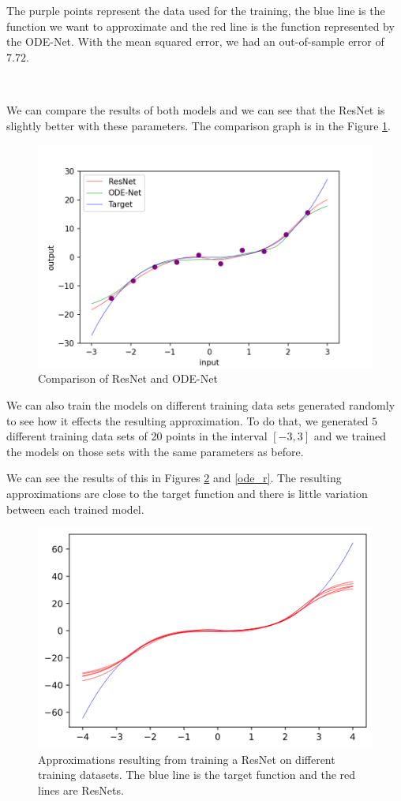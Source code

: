 \documentclass[10pt,a4paper]{article}
\theoremstyle{definition}
\theoremstyle{plain}
\begin{document}
The purple points represent the data used for the training, the blue line is the function we want to approximate and the red line is the function represented by the ODE-Net. With the mean squared error, we had an out-of-sample error of $7.72$.

~

We can compare the results of both models and we can see that the ResNet is slightly better with these parameters. The comparison graph is in the Figure \ref{comparaison}.
\begin{figure}[!h]
\center
\includegraphics[scale=0.75]{comparaison_final.png}
\caption{Comparison of ResNet and ODE-Net}
\label{comparaison}
\end{figure}


We can also train the models on different training data sets generated randomly to see how it effects the resulting approximation. To do that, we generated $5$ different training data sets of 20 points in the interval $[-3,3]$ and we trained the models on those sets with the same parameters as before.

We can see the results of this in Figures \ref{res_r} and \ref{ode_r}. The resulting approximations are close to the target function and there is little variation between each trained model.

\begin{figure}[!h]
\center
\includegraphics[scale=0.6]{resnet_random.png}
\caption{Approximations resulting from training a ResNet on different training datasets. The blue line is the target function and the red lines are ResNets.}
\label{res_r}
\end{figure}
\end{document}

